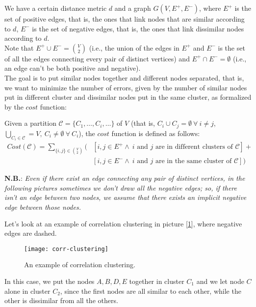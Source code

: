 We have a certain distance metric $d$ and a graph $G(V, E^+, E^-)$, where $E^+$ is the set of positive edges, that is, the ones that link nodes that are similar according to $d$, $E^-$ is the set of negative edges, that is, the ones that link dissimilar nodes according to $d$.\\
Note that $E^+ \cup E^- = \binom{V}{2}$ (i.e., the union of the edges in $E^+$ and $E^-$ is the set of all the edges connecting every pair of distinct vertices) and $E^+ \cap E^- = \emptyset$ (i.e., an edge can't be both positive and negative).\\
The goal is to put similar nodes together and different nodes separated, that is, we want to minimize the number of errors, given by the number of similar nodes put in different cluster and dissimilar nodes put in the same cluster, as formalized by the $cost$ function:

\begin{defn}[Cost]\label{def:clust-cost}
    Given a partition $\mathscr{C} = \{C_1, \ldots, C_i, \ldots\}$ of $V$ (that is, $C_i \cup C_j = \emptyset\ \forall\ i \neq j$, $\bigcup_{C_i \in \mathscr{C}} = V,\ C_i \neq \emptyset\ \forall\ C_i$), the $cost$ function is defined as follows:
    \begin{align}\label{eq:clust-cost}
        Cost(\mathscr{C}) = \sum_{\{i,j\} \in \binom{V}{2}} \bigl( &\left[ i,j \in E^+ \wedge\ i \text{ and } j \text{ are in different clusters of } \mathscr{C} \right] +\\
        &\left[ i,j \in E^- \wedge\ i \text{ and } j \text{ are in the same cluster of } \mathscr{C} \right] \bigr)\nonumber
    \end{align}
\end{defn}

\textbf{N.B.}: \textit{Even if there exist an edge connecting any pair of distinct vertices, in the following pictures sometimes we don't draw all the negative edges; so, if there isn't an edge between two nodes, we assume that there exists an implicit negative edge between those nodes.}

\begin{ex}
    Let's look at an example of correlation clustering in picture [\ref{fig:corr-clustering-ex}], where negative edges are dashed.
    
    \begin{figure}[h!]
        \centering
        \texttt{[image: corr-clustering]}
        \caption{An example of correlation clustering.}
        \label{fig:corr-clustering-ex}
    \end{figure}

    In this case, we put the nodes $A, B, D, E$ together in cluster $C_1$ and we let node $C$ alone in cluster $C_2$, since the first nodes are all similar to each other, while the other is dissimilar from all the others.
\end{ex}

